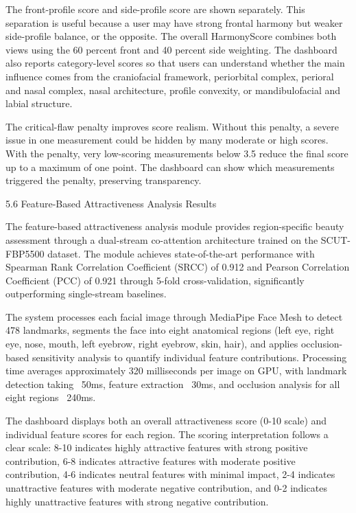 The front-profile score and side-profile score are shown separately. This separation is useful because a user may have strong frontal harmony but weaker side-profile balance, or the opposite. The overall HarmonyScore combines both views using the 60 percent front and 40 percent side weighting. The dashboard also reports category-level scores so that users can understand whether the main influence comes from the craniofacial framework, periorbital complex, perioral and nasal complex, nasal architecture, profile convexity, or mandibulofacial and labial structure.

The critical-flaw penalty improves score realism. Without this penalty, a severe issue in one measurement could be hidden by many moderate or high scores. With the penalty, very low-scoring measurements below 3.5 reduce the final score up to a maximum of one point. The dashboard can show which measurements triggered the penalty, preserving transparency.

5.6  Feature-Based Attractiveness Analysis Results

The feature-based attractiveness analysis module provides region-specific beauty assessment through a dual-stream co-attention architecture trained on the SCUT-FBP5500 dataset. The module achieves state-of-the-art performance with Spearman Rank Correlation Coefficient (SRCC) of 0.912 and Pearson Correlation Coefficient (PCC) of 0.921 through 5-fold cross-validation, significantly outperforming single-stream baselines.

The system processes each facial image through MediaPipe Face Mesh to detect 478 landmarks, segments the face into eight anatomical regions (left eye, right eye, nose, mouth, left eyebrow, right eyebrow, skin, hair), and applies occlusion-based sensitivity analysis to quantify individual feature contributions. Processing time averages approximately 320 milliseconds per image on GPU, with landmark detection taking ~50ms, feature extraction ~30ms, and occlusion analysis for all eight regions ~240ms.

The dashboard displays both an overall attractiveness score (0-10 scale) and individual feature scores for each region. The scoring interpretation follows a clear scale: 8-10 indicates highly attractive features with strong positive contribution, 6-8 indicates attractive features with moderate positive contribution, 4-6 indicates neutral features with minimal impact, 2-4 indicates unattractive features with moderate negative contribution, and 0-2 indicates highly unattractive features with strong negative contribution.

